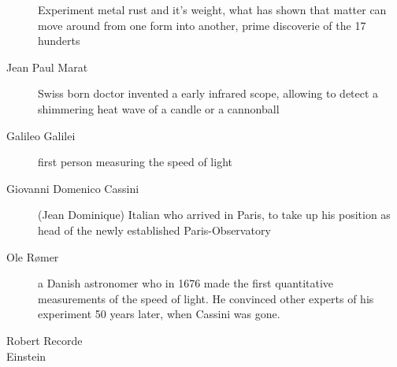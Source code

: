 \begin{description}
	Experiment metal rust and it's weight, what has shown that matter can move around from one form into another, prime discoverie of the 17 hunderts
	
	\item[Jean Paul Marat] Swiss born doctor invented a early infrared scope, allowing to detect a shimmering heat wave of a candle or a cannonball
	
	\item[Galileo Galilei] first person measuring the speed of light
	
	\item[Giovanni Domenico Cassini] (Jean Dominique) Italian who arrived in Paris, to take up his position as head of the newly established Paris-Observatory
	
	\item[Ole Rømer] a Danish astronomer who in 1676 made the first quantitative measurements of the speed of light. He convinced other experts of his experiment 50 years later, when Cassini was gone.
	
	\item [Robert Recorde]
	\item [Einstein]
	
\end{description}
